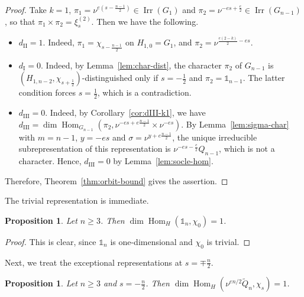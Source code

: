\documentclass[11pt]{amsart}
\numberwithin{equation}{section}
\theoremstyle{plain}
\newtheorem{proposition}[theorem]{Proposition}
\theoremstyle{definition}
\theoremstyle{remark}
\newcommand{\one}{\mathds{1}}
\DeclareMathOperator{\Hom}{Hom}
\DeclareMathOperator{\Irr}{Irr}
\newcommand{\Qt}{\widetilde{Q}}
\newcommand{\xitwo}{\xi^{(2)}}
\newcommand{\dI}{d_{\mathrm{I}}}
\newcommand{\dII}{d_{\mathrm{II}}}
\newcommand{\dIII}{d_{\mathrm{III}}}
\begin{document}
\begin{proof}
	Take $k=1$, $\pi_1=\nu^{e(s-\frac{n-1}2)}\in\Irr(G_1)$ and $\pi_2=\nu^{-es+\frac e2}\in\Irr(G_{n-1})$, so that $\pi_1\times\pi_2=\xitwo_s$. Then we have the following.
	\begin{itemize}
		\item $\dII=1$. Indeed, $\pi_1=\chi_{s-\frac{n-1}2}$ on $H_{1,0}=G_1$, and $\pi_2=\nu^{\frac{e(2-k)}2-es}$.
		\item $\dI=0$. Indeed, by Lemma~\ref{lem:char-dist}, the character $\pi_2$ of $G_{n-1}$ is $(H_{1,n-2},\chi_{s+\frac12})$-distinguished only if $s=-\frac12$ and $\pi_2=\one_{n-1}$. The latter condition forces $s=\frac12$, which is a contradiction.
		\item $\dIII=0$. Indeed, by Corollary~\ref{cor:dIII-k1}, we have $\dIII=\dim\Hom_{G_{n-1}}(\pi_2,\nu^{-es+e\frac{n-1}2}\times\nu^{-es})$. By Lemma~\ref{lem:sigma-char} with $m=n-1$, $y=-es$ and $\sigma=\nu^{y+e\frac{n-1}2}$, the unique irreducible subrepresentation of this representation is $\nu^{-es-\frac e2}Q_{n-1}$, which is not a character. Hence, $\dIII=0$ by Lemma~\ref{lem:socle-hom}.
	\end{itemize}
	Therefore, Theorem~\ref{thm:orbit-bound} gives the assertion.
\end{proof}

The trivial representation is immediate.

\begin{proposition}\label{prop:mult-trivial}
	Let $n\ge3$. Then $\dim\Hom_H(\one_n,\chi_0)=1$.
\end{proposition}

\begin{proof}
	This is clear, since $\one_n$ is one-dimensional and $\chi_0$ is trivial.
\end{proof}

Next, we treat the exceptional representations at $s=\mp\frac n2$.

\begin{proposition}\label{prop:mult-Qtn}
	Let $n\ge3$ and $s=-\frac n2$. Then $\dim\Hom_H(\nu^{en/2}\Qt_n,\chi_s)=1$.
\end{proposition}
\end{document}
